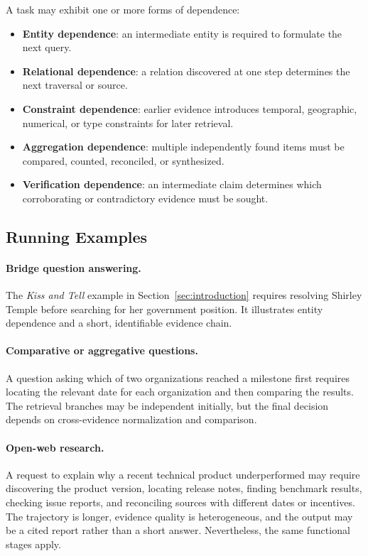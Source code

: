 A task may exhibit one or more forms of dependence:
\begin{itemize}[leftmargin=1.35em]
\item \textbf{Entity dependence}: an intermediate entity is required to formulate the next query.
\item \textbf{Relational dependence}: a relation discovered at one step determines the next traversal or source.
\item \textbf{Constraint dependence}: earlier evidence introduces temporal, geographic, numerical, or type constraints for later retrieval.
\item \textbf{Aggregation dependence}: multiple independently found items must be compared, counted, reconciled, or synthesized.
\item \textbf{Verification dependence}: an intermediate claim determines which corroborating or contradictory evidence must be sought.
\end{itemize}

\subsection{Running Examples}
\label{subsec:running_examples}

\paragraph{Bridge question answering.}
The \emph{Kiss and Tell} example in Section~\ref{sec:introduction} requires resolving Shirley Temple before searching for her government position. It illustrates entity dependence and a short, identifiable evidence chain.

\paragraph{Comparative or aggregative questions.}
A question asking which of two organizations reached a milestone first requires locating the relevant date for each organization and then comparing the results. The retrieval branches may be independent initially, but the final decision depends on cross-evidence normalization and comparison.

\paragraph{Open-web research.}
A request to explain why a recent technical product underperformed may require discovering the product version, locating release notes, finding benchmark results, checking issue reports, and reconciling sources with different dates or incentives. The trajectory is longer, evidence quality is heterogeneous, and the output may be a cited report rather than a short answer. Nevertheless, the same functional stages apply.

